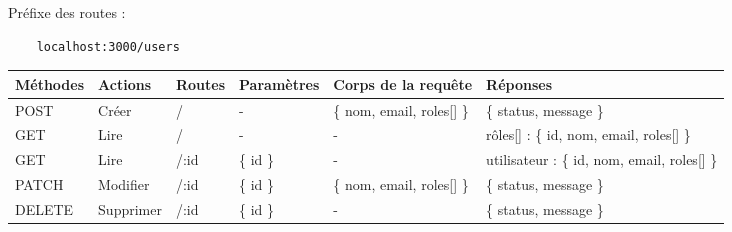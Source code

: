 Préfixe des routes :
\begin{lstlisting}
    localhost:3000/users
\end{lstlisting}

\begin{center}
    \begin{tabularx}{1\textwidth} {
            | >{\raggedright\arraybackslash}X
            | >{\centering\arraybackslash}X
            | >{\centering\arraybackslash}X
            | >{\centering\arraybackslash}X
            | >{\centering\arraybackslash}X
            | >{\raggedleft\arraybackslash}X |
        }
        \hline
            Méthodes & Actions & Routes & Paramètres & Corps de la requête & Réponses \\
        \hline
            POST  & Créer & / &  - & \{ nom, email, roles[] \} & \{ status, message \} \\
        \hline
            GET  & Lire &  / & - & - & r\^oles[] : \{ id, nom, email, roles[] \}  \\
        \hline
            GET  & Lire & /:id & \{ id \} & - & utilisateur : \{ id, nom, email, roles[] \} \\
        \hline
            PATCH  & Modifier & /:id & \{ id \} & \{ nom, email, roles[] \} & \{ status, message \} \\
        \hline
            DELETE & Supprimer  & /:id & \{ id \} & - & \{ status, message \} \\
        \hline
    \end{tabularx}
\end{center}
\pagebreak